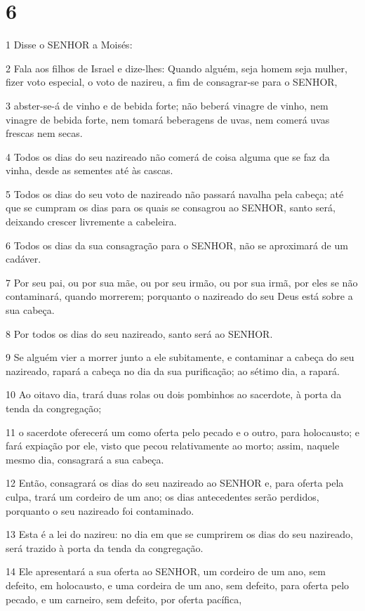 \chapter{6}

\par 1 Disse o SENHOR a Moisés:
\par 2 Fala aos filhos de Israel e dize-lhes: Quando alguém, seja homem seja mulher, fizer voto especial, o voto de nazireu, a fim de consagrar-se para o SENHOR,
\par 3 abster-se-á de vinho e de bebida forte; não beberá vinagre de vinho, nem vinagre de bebida forte, nem tomará beberagens de uvas, nem comerá uvas frescas nem secas.
\par 4 Todos os dias do seu nazireado não comerá de coisa alguma que se faz da vinha, desde as sementes até às cascas.
\par 5 Todos os dias do seu voto de nazireado não passará navalha pela cabeça; até que se cumpram os dias para os quais se consagrou ao SENHOR, santo será, deixando crescer livremente a cabeleira.
\par 6 Todos os dias da sua consagração para o SENHOR, não se aproximará de um cadáver.
\par 7 Por seu pai, ou por sua mãe, ou por seu irmão, ou por sua irmã, por eles se não contaminará, quando morrerem; porquanto o nazireado do seu Deus está sobre a sua cabeça.
\par 8 Por todos os dias do seu nazireado, santo será ao SENHOR.
\par 9 Se alguém vier a morrer junto a ele subitamente, e contaminar a cabeça do seu nazireado, rapará a cabeça no dia da sua purificação; ao sétimo dia, a rapará.
\par 10 Ao oitavo dia, trará duas rolas ou dois pombinhos ao sacerdote, à porta da tenda da congregação;
\par 11 o sacerdote oferecerá um como oferta pelo pecado e o outro, para holocausto; e fará expiação por ele, visto que pecou relativamente ao morto; assim, naquele mesmo dia, consagrará a sua cabeça.
\par 12 Então, consagrará os dias do seu nazireado ao SENHOR e, para oferta pela culpa, trará um cordeiro de um ano; os dias antecedentes serão perdidos, porquanto o seu nazireado foi contaminado.
\par 13 Esta é a lei do nazireu: no dia em que se cumprirem os dias do seu nazireado, será trazido à porta da tenda da congregação.
\par 14 Ele apresentará a sua oferta ao SENHOR, um cordeiro de um ano, sem defeito, em holocausto, e uma cordeira de um ano, sem defeito, para oferta pelo pecado, e um carneiro, sem defeito, por oferta pacífica,
